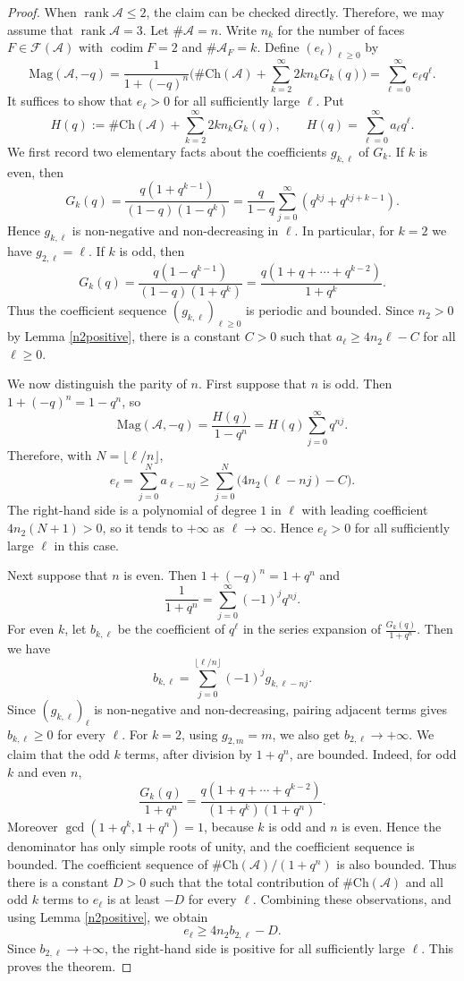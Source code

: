 \documentclass[10pt,a4paper]{amsart}
\newcommand{\A}{\mathcal{A}}
\newcommand{\Ch}{\mathrm{Ch}}
\newcommand{\FF}{\mathcal{F}}
\newcommand{\Mag}{\mathrm{Mag}}
\DeclareMathOperator{\codim}{codim}
\DeclareMathOperator{\rank}{rank}
\begin{document}
\begin{proof}
When $\rank\A\leq 2$, the claim can be checked directly.
Therefore, we may assume that $\rank \A=3$.
Let $\#\A=n$.
Write $n_k$ for the number of faces $F\in \FF(\A)$ with $\codim F=2$ and $\#\A_F=k$.
Define $(e_\ell)_{\ell\geq 0}$ by
\[
\Mag(\A,-q)=\dfrac{1}{1+(-q)^n}\biggl(\#\Ch(\A)+\sum_{k=2}^\infty 2kn_kG_k(q)\biggr)=\sum_{\ell=0}^\infty e_\ell q^\ell.
\]
It suffices to show that $e_\ell>0$ for all sufficiently large $\ell$.
Put
\[
H(q):=\#\Ch(\A)+\sum_{k=2}^{\infty}2k n_kG_k(q),\qquad
H(q)=\sum_{\ell=0}^\infty a_\ell q^\ell .
\]
We first record two elementary facts about the coefficients $g_{k,\ell}$ of $G_k$.
If $k$ is even, then
\[
G_k(q)=\frac{q(1+q^{k-1})}{(1-q)(1-q^k)}
      =\frac{q}{1-q}\sum_{j=0}^\infty\left(q^{kj}+q^{kj+k-1}\right).
\]
Hence $g_{k,\ell}$ is non-negative and non-decreasing in $\ell$.  In particular,
for $k=2$ we have $g_{2,\ell}=\ell$.
If $k$ is odd, then
\[
G_k(q)=\frac{q(1-q^{k-1})}{(1-q)(1+q^k)}
      =\frac{q(1+q+\cdots+q^{k-2})}{1+q^k}.
\]
Thus the coefficient sequence $(g_{k,\ell})_{\ell\ge 0}$ is periodic and bounded.
Since $n_2>0$ by Lemma \ref{n2positive}, there is a constant
$C>0$ such that $a_\ell\ge 4n_2\ell-C$ for all $\ell\ge 0$.

We now distinguish the parity of $n$.
First suppose that $n$ is odd.  Then $1+(-q)^n=1-q^n$, so
\[
\Mag(\A,-q)=\frac{H(q)}{1-q^n}=H(q)\sum_{j=0}^\infty q^{nj}.
\]
Therefore, with $N=\lfloor \ell/n\rfloor$,
\[
e_\ell=\sum_{j=0}^{N}a_{\ell-nj}
     \ge \sum_{j=0}^{N}\bigl(4n_2(\ell-nj)-C\bigr).
\]
The right-hand side is a polynomial of degree $1$ in $\ell$ with leading coefficient $4n_2(N+1)>0$, so it tends to $+\infty$ as $\ell\to\infty$.
Hence $e_\ell>0$ for all
sufficiently large $\ell$ in this case.

Next suppose that $n$ is even.  Then $1+(-q)^n=1+q^n$ and
\[
\frac{1}{1+q^n}=\sum_{j=0}^\infty (-1)^j q^{nj}.
\]
For even $k$, let $b_{k,\ell}$ be the coefficient of $q^\ell$ in the series expansion of $\frac{G_k(q)}{1+q^n}$.
Then we have
\[
b_{k,\ell}=\sum_{j=0}^{\lfloor \ell/n\rfloor}(-1)^jg_{k,\ell-nj}.
\]
Since $(g_{k,\ell})_\ell$ is non-negative and non-decreasing, pairing adjacent
terms gives $b_{k,\ell}\ge 0$ for every $\ell$.
For $k=2$, using $g_{2,m}=m$, we also get $b_{2,\ell}\to +\infty$.
We claim that the odd $k$ terms, after division by $1+q^n$, are
bounded.  Indeed, for odd $k$ and even $n$,
\[
\frac{G_k(q)}{1+q^n}
 =\frac{q(1+q+\cdots+q^{k-2})}{(1+q^k)(1+q^n)}.
\]
Moreover $\gcd(1+q^k,1+q^n)=1$, because $k$ is odd and $n$ is even.  Hence the
denominator has only simple roots of unity, and the coefficient sequence is
bounded.  The coefficient sequence of $\#\Ch(\A)/(1+q^n)$ is also bounded.  Thus there
is a constant $D>0$ such that the total contribution of $\#\Ch(\A)$ and all odd $k$
terms to $e_\ell$ is at least $-D$ for every $\ell$.
Combining these observations, and using Lemma \ref{n2positive}, we obtain
\[
e_\ell\ge 4n_2 b_{2,\ell}-D.
\]
Since $b_{2,\ell}\to +\infty$, the right-hand side is positive for all
sufficiently large $\ell$.  This proves the theorem.
\end{proof}
\end{document}

